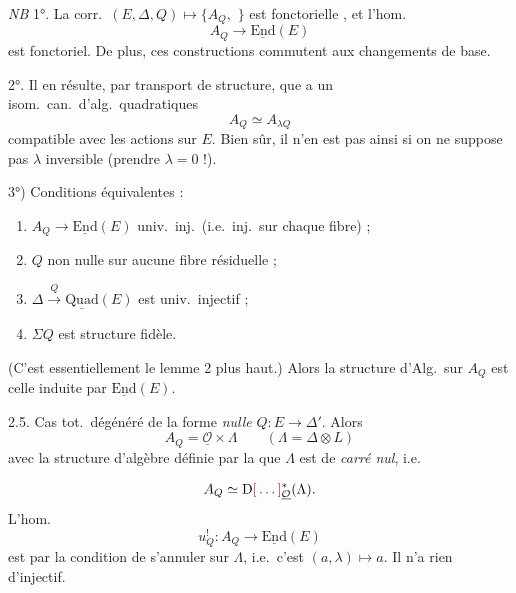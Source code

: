 \documentclass[11pt,a4paper]{article}
\begin{document}
\emph{NB} 1°. La corr.\ $(E, \Delta, Q) \mapsto \{A_Q,$ $\}$ est fonctorielle , et l'hom.\ 
\[
  A_Q \to \underline{\mathrm{End}}(E)
\]
est fonctoriel. De plus, ces constructions commutent aux changements de base.

2°. Il en résulte, par transport de structure, que  a un isom.\ can.\ d'alg.\ quadratiques
\[
  A_Q \simeq A_{\lambda Q}
\]
compatible avec les actions sur $E$. Bien sûr, il n'en est pas ainsi si on ne suppose pas $\lambda$ inversible (prendre $\lambda = 0$ !).

3°) Conditions équivalentes :
\begin{enumerate}
  \item[a)] $A_Q \to \underline{\mathrm{End}}(E)$ univ.\ inj.\ (i.e.\ inj.\ sur chaque fibre) ;
  \item[b)] $Q$ non nulle sur aucune fibre résiduelle ;
  \item[c)] $\Delta \xrightarrow{Q} \underline{\mathrm{Quad}}(E)$ est univ.\ injectif ;
  \item[d)] $\Sigma Q$ est structure fidèle.
\end{enumerate}
(C'est essentiellement le lemme 2 plus haut.) Alors la structure d'Alg.\ sur $A_Q$ est  celle induite par $\underline{\mathrm{End}}(E)$.

2.5. Cas tot.\ dégénéré de la forme \emph{nulle} $Q \colon E \to \Delta'$. Alors
\[
  A_Q = \underline{\mathcal{O}} \times \Lambda \qquad (\Lambda = \Delta \otimes L)
\]
avec la structure d'algèbre définie par la  que $\Lambda$ est de \emph{carré nul}, i.e.

\[
  A_Q \simeq \mathrm{D}\ill{}^{*}_{\underline{\mathcal{O}}}(\Lambda) .
\]
L'hom.
\[
  u_Q^{!} \colon A_Q \to \underline{\mathrm{End}}(E)
\]
est   par la condition  de s'annuler sur $\Lambda$, i.e.\ c'est $(a, \lambda) \mapsto a$.  Il n'a rien d'injectif.
\end{document}
